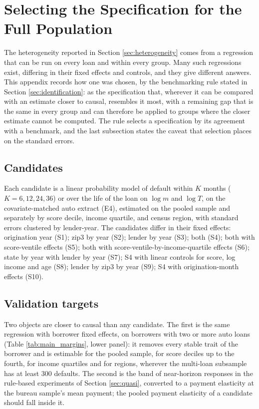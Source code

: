 \section{Selecting the Specification for the Full Population}\label{appendix:bridge}

The heterogeneity reported in Section \ref{sec:heterogeneity} comes from a regression that can be run on every loan and within every group. Many such regressions exist, differing in their fixed effects and controls, and they give different answers. This appendix records how one was chosen, by the benchmarking rule stated in Section \ref{sec:identification}: as the specification that, wherever it can be compared with an estimate closer to causal, resembles it most, with a remaining gap that is the same in every group and can therefore be applied to groups where the closer estimate cannot be computed. The rule selects a specification by its agreement with a benchmark, and the last subsection states the caveat that selection places on the standard errors.

\subsection{Candidates}
Each candidate is a linear probability model of default within $K$ months ($K = 6, 12, 24, 36$) or over the life of the loan on $\log m$ and $\log T$, on the covariate-matched auto extract (E4), estimated on the pooled sample and separately by score decile, income quartile, and census region, with standard errors clustered by lender-year. The candidates differ in their fixed effects: origination year (S1); zip3 by year (S2); lender by year (S3); both (S4); both with score-ventile effects (S5); both with score-ventile-by-income-quartile effects (S6); state by year with lender by year (S7); S4 with linear controls for score, log income and age (S8); lender by zip3 by year (S9); S4 with origination-month effects (S10).

\subsection{Validation targets}
Two objects are closer to causal than any candidate. The first is the same regression with borrower fixed effects, on borrowers with two or more auto loans (Table \ref{tab:main_margins}, lower panel): it removes every stable trait of the borrower and is estimable for the pooled sample, for score deciles up to the fourth, for income quartiles and for regions, wherever the multi-loan subsample has at least 300 defaults. The second is the band of near-horizon responses in the rule-based experiments of Section \ref{sec:quasi}, converted to a payment elasticity at the bureau sample's mean payment; the pooled payment elasticity of a candidate should fall inside it.

